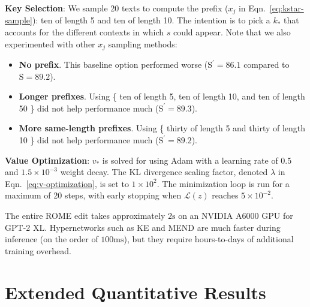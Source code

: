 \documentclass{article}
\newcommand{\refeqn}[1]{Eqn.~\ref{eq:#1}}
\begin{document}
\begin{appendices}
\textbf{Key Selection}: We sample 20 texts to compute the prefix ($x_j$ in \refeqn{kstar-sample}): ten of length 5 and ten of length 10. The intention is to pick a $k_*$ that accounts for the different contexts in which $s$ could appear. Note that we also experimented with other $x_j$ sampling methods:
\begin{itemize}[leftmargin=12pt,topsep=0pt,parsep=0pt,partopsep=0pt,itemsep=3pt]
    \item \textbf{No prefix}. This baseline option performed worse ($\mathrm{S}^\prime = 86.1$ compared to $\mathrm{S}=89.2$).
    \item \textbf{Longer prefixes}. Using \{ ten of length 5, ten of length 10, and ten of length 50 \} did not help performance much ($\mathrm{S}^\prime = 89.3$).
    \item \textbf{More same-length prefixes}. Using \{ thirty of length 5 and thirty of length 10 \} did not help performance much ($\mathrm{S}^\prime = 89.2$).
\end{itemize}

\textbf{Value Optimization}: $v_*$ is solved for using Adam with a learning rate of $0.5$ and $1.5\times 10^{-3}$ weight decay. The KL divergence scaling factor, denoted $\lambda$ in Eqn.~\ref{eq:v-optimization}, is set to $1\times 10^{2}$. The minimization loop is run for a maximum of 20 steps, with early stopping when $\mathcal{L}(z)$ reaches $5\times 10^{-2}$.

The entire ROME edit takes approximately $2\mathrm{s}$ on an NVIDIA A6000 GPU for GPT-2 XL. Hypernetworks such as KE and MEND are much faster during inference (on the order of $100\mathrm{ms}$), but they require hours-to-days of additional training overhead.


\section{Extended Quantitative Results} \label{apd:smaller-model-results}


\addtolength{\tabcolsep}{1.5pt}


\end{appendices}
\end{document}
